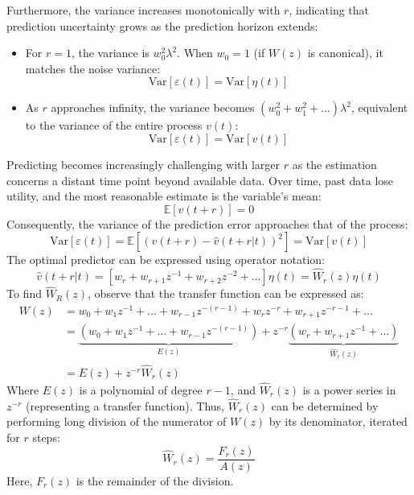 Furthermore, the variance increases monotonically with $r$, indicating that prediction uncertainty grows as the prediction horizon extends:
\begin{itemize}
    \item For $r=1$, the variance is $w_0^2\lambda^2$.
        When $w_0=1$ (if $W(z)$ is canonical), it matches the noise variance:
        \[\text{Var}\left[\varepsilon(t) \right]=\text{Var}\left[\eta(t) \right]\]
    \item As $r$ approaches infinity, the variance becomes $(w_0^2 + w_1^2 + \dots)\lambda^2$, equivalent to the variance of the entire process $v(t)$:
        \[\text{Var}\left[\varepsilon(t) \right]=\text{Var}\left[v(t) \right]\]
\end{itemize}
Predicting becomes increasingly challenging with larger $r$ as the estimation concerns a distant time point beyond available data. 
Over time, past data lose utility, and the most reasonable estimate is the variable's mean:
\[\mathbb{E}\left[v(t+r)\right]=0\]
Consequently, the variance of the prediction error approaches that of the process:
\[\text{Var}\left[\varepsilon(t)\right]=\mathbb{E}\left[\left(v(t+r)-\hat{v}(t+r|t)\right)^2\right]=\text{Var}\left[v(t)\right]\]
The optimal predictor can be expressed using operator notation:
\[\hat{v}(t+r|t)=\left[w_r+w_{r+1}z^{-1}+w_{r+2}z^{-2}+\dots \right]\eta(t)=\hat{W}_r(z)\eta(t)\]
To find $\hat{W}_R(z)$, observe that the transfer function can be expressed as:
\begin{align*}
    W(z)    &= w_0+w_1z^{-1} + \dots + w_{r-1}z^{-(r-1)}+w_rz^{-r}+w_{r+1}z^{-r-1}+\dots \\
            &= \underbrace{\left(w_0+w_1z^{-1} + \dots + w_{r-1}z^{-(r-1)}\right)}_{E(z)}  +z^{-r}\underbrace{\left( w_r+w_{r+1}z^{-1}+\dots\right)}_{\hat{W}_r(z)} \\
            &= E(z)  +z^{-r}\hat{W}_r(z)              
\end{align*}
Where $E(z)$ is a polynomial of degree $r-1$, and $\hat{W}_r(z)$ is a power series in $z^{-r}$ (representing a transfer function).
Thus, $\hat{W}_r(z)$ can be determined by performing long division of the numerator of $W(z)$ by its denominator, iterated for $r$ steps:
\[\hat{W}_r(z)=\dfrac{F_r(z)}{A(z)}\]
Here, $F_r(z)$ is the remainder of the division.

